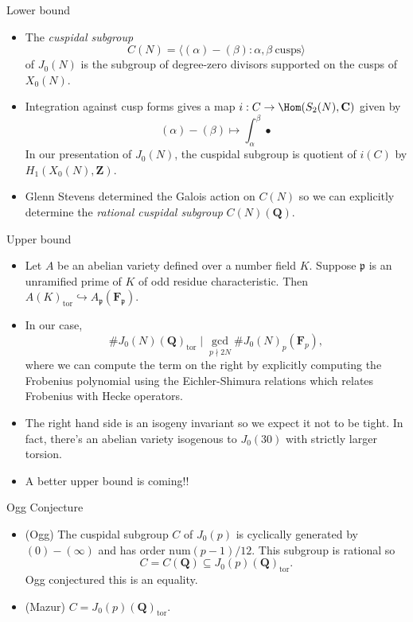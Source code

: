 \documentclass{beamer}
\newcommand{\QQ}{\mathbf{Q}}
\newcommand{\FF}{\mathbf{F}}
\newcommand{\ZZ}{\mathbf{Z}}
\newcommand{\CC}{\mathbf{C}}
\newcommand{\tor}{\mathrm{tor}}
\newcommand{\p}{\mathfrak{p}}
\begin{document}
\begin{frame}{Lower bound}
    \begin{itemize}
        \item    
            The \emph{cuspidal subgroup} 
            \[
                C(N) = \langle (\alpha)-(\beta):\alpha,\beta~\text{cusps}
                \rangle
            \]
            of $J_0(N)$ is the subgroup of
            degree-zero divisors supported on the cusps of $X_0(N)$.
            \pause
        \item
            Integration against cusp forms
            gives a map $i:C\to \Hom(S_2(N), \CC)$ given by 
            \[
                (\alpha)-(\beta) \mapsto \int_\alpha ^\beta \bullet
            \]
            In our presentation of $J_0(N)$, the cuspidal subgroup is
            quotient of $i(C)$ by $H_1(X_0(N), \ZZ)$. 
            \pause
        \item
            Glenn Stevens determined the Galois action on $C(N)$ so we can
            explicitly determine the \emph{rational cuspidal subgroup}
            $C(N)(\QQ)$.
    \end{itemize}
\end{frame}

\begin{frame}{Upper bound}
    \begin{itemize}
        \item 
            Let $A$ be an abelian variety defined over a number field $K$.
            Suppose $\p$ is an unramified prime of $K$ of odd residue
            characteristic. Then $A(K)_\tor \hookrightarrow A_\p(\FF_\p)$.
        \item
            In our case,
            \[
                \#J_0(N)(\QQ)_\tor \mid  \gcd_{p\nmid 2N} \#J_0(N)_p (\FF_p),
            \]
            where we can compute the term on the right by explicitly computing
            the Frobenius polynomial using the Eichler-Shimura relations which
            relates Frobenius with Hecke operators.
        \item
            The right hand side is an isogeny invariant so we expect it not to
            be tight. In fact, there's an abelian variety isogenous to
            $J_0(30)$ with strictly larger torsion.
        \item
            A better upper bound is coming!!
    \end{itemize} 
\end{frame}

\begin{frame}{Ogg Conjecture}
    \begin{itemize}
        \item 
            (Ogg) The cuspidal subgroup $C$ of $J_0(p)$ is cyclically generated
            by $(0)-(\infty)$ and has order $\mathrm{num} (p-1)/12$. This
            subgroup is rational so 
            \[
                C=C(\QQ)\subseteq J_0(p)(\QQ)_\tor.
            \]
            Ogg conjectured this is an equality.
            \pause
        \item
            (Mazur) $C=J_0(p)(\QQ)_\tor$.
    \end{itemize}
\end{frame}
\end{document}
